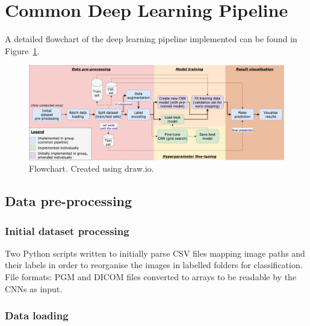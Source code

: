 
\section{Common Deep Learning Pipeline}

A detailed flowchart of the deep learning pipeline implemented can be found in  Figure~\ref{fig:implementation-detailed-flowchart}.

\begin{figure}[ht]
\centerline{\includegraphics[width=1.25\textwidth]{figures/implementation/detailed flowchart.png}}
\caption{\label{fig:implementation-detailed-flowchart}Flowchart. Created using draw.io.}
\end{figure}


\subsection{Data pre-processing}

\subsubsection{Initial dataset processing}

Two Python scripts written to initially parse CSV files mapping image paths and their labels in order to reorganise the images in labelled folders for classification.\\

File formats: PGM and DICOM files converted to arrays to be readable by the CNNs as input.\\


\subsubsection{Data loading}

